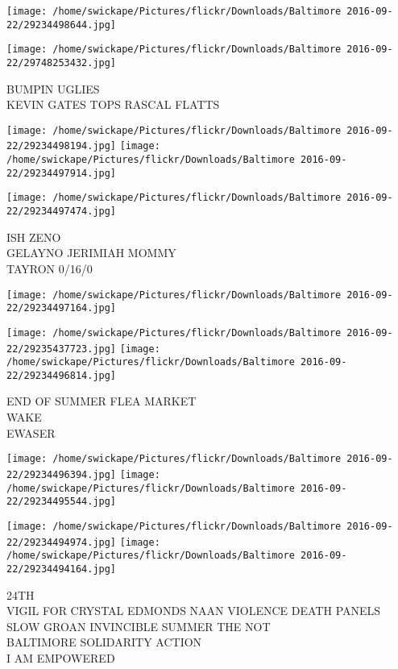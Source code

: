 \documentclass[10pt,letterpaper]{article}
\begin{document}
\texttt{[image: /home/swickape/Pictures/flickr/Downloads/Baltimore 2016-09-22/29234498644.jpg]}

\vspace{0.25in}
\texttt{[image: /home/swickape/Pictures/flickr/Downloads/Baltimore 2016-09-22/29748253432.jpg]}

BUMPIN UGLIES\\
KEVIN GATES TOPS RASCAL FLATTS\\
\pagebreak

\texttt{[image: /home/swickape/Pictures/flickr/Downloads/Baltimore 2016-09-22/29234498194.jpg]}
\texttt{[image: /home/swickape/Pictures/flickr/Downloads/Baltimore 2016-09-22/29234497914.jpg]}

\vspace{0.25in}
\texttt{[image: /home/swickape/Pictures/flickr/Downloads/Baltimore 2016-09-22/29234497474.jpg]}

ISH ZENO\\
GELAYNO JERIMIAH MOMMY\\
TAYRON 0/16/0\\
\pagebreak

\texttt{[image: /home/swickape/Pictures/flickr/Downloads/Baltimore 2016-09-22/29234497164.jpg]}

\vspace{0.25in}
\texttt{[image: /home/swickape/Pictures/flickr/Downloads/Baltimore 2016-09-22/29235437723.jpg]}
\texttt{[image: /home/swickape/Pictures/flickr/Downloads/Baltimore 2016-09-22/29234496814.jpg]}

END OF SUMMER FLEA MARKET\\
WAKE\\
EWASER\\
\pagebreak

\texttt{[image: /home/swickape/Pictures/flickr/Downloads/Baltimore 2016-09-22/29234496394.jpg]}
\texttt{[image: /home/swickape/Pictures/flickr/Downloads/Baltimore 2016-09-22/29234495544.jpg]}

\texttt{[image: /home/swickape/Pictures/flickr/Downloads/Baltimore 2016-09-22/29234494974.jpg]}
\texttt{[image: /home/swickape/Pictures/flickr/Downloads/Baltimore 2016-09-22/29234494164.jpg]}

24TH\\
VIGIL FOR CRYSTAL EDMONDS NAAN VIOLENCE DEATH PANELS SLOW GROAN INVINCIBLE SUMMER THE NOT\\
BALTIMORE SOLIDARITY ACTION\\
I AM EMPOWERED\\
\pagebreak
\end{document}
